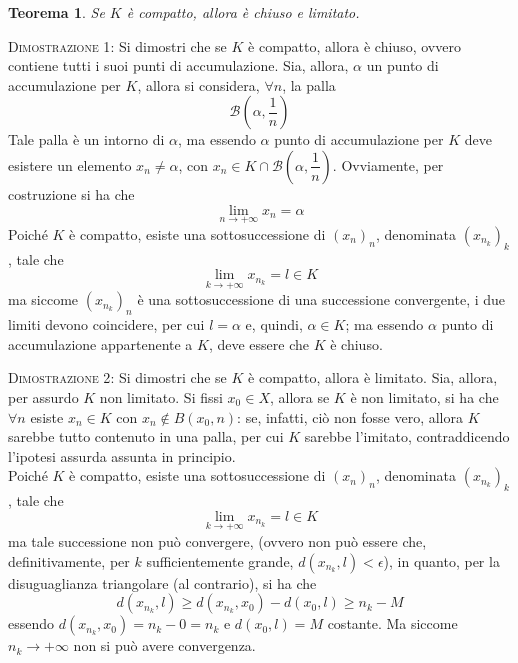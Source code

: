 \documentclass[a4paper]{extarticle}
\newtheorem{theorem}{Teorema}[section]
\begin{document}
\vspace{1em}
\noindent
\begin{theorem}
    Se $K$ è compatto, allora è chiuso e limitato.
\end{theorem}

\vspace{2em}
\noindent
\normalfont \normalsize
\textsc{Dimostrazione 1}: Si dimostri che se $K$ è compatto, allora è chiuso, ovvero contiene tutti i suoi punti di accumulazione. Sia, allora, $\alpha$ un punto di accumulazione per $K$, allora si considera, $\forall n$, la palla
\[\mathcal{B} \left(\alpha, \frac{1}{n}\right)\]
Tale palla è un intorno di $\alpha$, ma essendo $\alpha$ punto di accumulazione per $K$ deve esistere un elemento $x_n \neq \alpha$, con $x_n \in K \cap \mathcal{B} \left(\alpha, \dfrac{1}{n}\right)$. Ovviamente, per costruzione si ha che
\[\lim_{n \to +\infty} x_n = \alpha\]
Poiché $K$ è compatto, esiste una sottosuccessione di $(x_n)_n$, denominata $(x_{n_k})_k$, tale che
\[\lim_{k \to +\infty} x_{n_k} = l \in K\]
ma siccome $(x_{n_k})_n$ è una sottosuccessione di una successione convergente, i due limiti devono coincidere, per cui $l=\alpha$ e, quindi, $\alpha \in K$; ma essendo $\alpha$ punto di accumulazione appartenente a $K$, deve essere che $K$ è chiuso.

\vspace{2em}
\noindent
\normalfont \normalsize
\textsc{Dimostrazione 2}: Si dimostri che se $K$ è compatto, allora è limitato. Sia, allora, per assurdo $K$ non limitato. Si fissi $x_0 \in X$, allora se $K$ è non limitato, si ha che $\forall n$ esiste $x_n \in K$ con $x_n \notin B \left(x_0,n\right)$: se, infatti, ciò non fosse vero, allora $K$ sarebbe tutto contenuto in una palla, per cui $K$ sarebbe l'imitato, contraddicendo l'ipotesi assurda assunta in principio.\\
Poiché $K$ è compatto, esiste una sottosuccessione di $(x_n)_n$, denominata $(x_{n_k})_k$, tale che
\[\lim_{k \to +\infty} x_{n_k} = l \in K\]
ma tale successione non può convergere, (ovvero non può essere che, definitivamente, per $k$ sufficientemente grande, $d(x_{n_k},l)<\epsilon$), in quanto, per la disuguaglianza triangolare (al contrario), si ha che 
\[d(x_{n_k},l) \geq d(x_{n_k},x_0) - d(x_0,l) \geq n_k - M\]
essendo $d(x_{n_k},x_0)=n_k-0=n_k$ e $d(x_0,l)=M$ costante. Ma siccome $n_k \to +\infty$ non si può avere convergenza.
\end{document}
